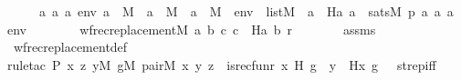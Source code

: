 \begin{isabellebody}
\ \ \ \ {\isachardoublequoteopen}\ {\isacharparenleft}{\kern0pt}{\isasymAnd}a{}\ a{}\ a{}\ env{\isachardot}{\kern0pt}\ a{}\ {\isasymin}\ M\ {\isasymLongrightarrow}\ a{}\ {\isasymin}\ M\ {\isasymLongrightarrow}\ a{}\ {\isasymin}\ M\ {\isasymLongrightarrow}\ env\ {\isasymin}\ list{\isacharparenleft}{\kern0pt}M{\isacharparenright}{\kern0pt}\ {\isasymLongrightarrow}\ a{}\ {\isacharequal}{\kern0pt}\ H{\isacharparenleft}{\kern0pt}a{}{\isacharcomma}{\kern0pt}\ a{}{\isacharparenright}{\kern0pt}\ {\isasymlongleftrightarrow}\ sats{\isacharparenleft}{\kern0pt}M{\isacharcomma}{\kern0pt}\ p{\isacharcomma}{\kern0pt}\ {\isacharbrackleft}{\kern0pt}a{}{\isacharcomma}{\kern0pt}\ a{}{\isacharcomma}{\kern0pt}\ a{}{\isacharbrackright}{\kern0pt}\ {\isacharat}{\kern0pt}\ env{\isacharparenright}{\kern0pt}{\isacharparenright}{\kern0pt}{\isachardoublequoteclose}\ \ \isanewline
\ \ \isanewline
\ \ \ {\isachardoublequoteopen}wfrec{\isacharunderscore}{\kern0pt}replacement{\isacharparenleft}{\kern0pt}{\isacharhash}{\kern0pt}{\isacharhash}{\kern0pt}M{\isacharcomma}{\kern0pt}\ {\isasymlambda}a\ b\ c{\isachardot}{\kern0pt}\ c\ {\isacharequal}{\kern0pt}\ H{\isacharparenleft}{\kern0pt}a{\isacharcomma}{\kern0pt}\ b{\isacharparenright}{\kern0pt}{\isacharcomma}{\kern0pt}\ r{\isacharparenright}{\kern0pt}{\isachardoublequoteclose}\ \isanewline
%
\isadelimproof
\ \ \isanewline
\ \ %
\endisadelimproof
%
\isatagproof
{}\isamarkupfalse%
\ assms\isanewline
\ \ \isamarkupfalse%
\ wfrec{\isacharunderscore}{\kern0pt}replacement{\isacharunderscore}{\kern0pt}def\isanewline
\ \ \isamarkupfalse%
{\isacharparenleft}{\kern0pt}rule{\isacharunderscore}{\kern0pt}tac\ P{\isacharequal}{\kern0pt}{\isachardoublequoteopen}\ {\isasymlambda}x\ z{\isachardot}{\kern0pt}\ {\isasymexists}y{\isacharbrackleft}{\kern0pt}{\isacharhash}{\kern0pt}{\isacharhash}{\kern0pt}M{\isacharbrackright}{\kern0pt}{\isachardot}{\kern0pt}\ {\isasymexists}g{\isacharbrackleft}{\kern0pt}{\isacharhash}{\kern0pt}{\isacharhash}{\kern0pt}M{\isacharbrackright}{\kern0pt}{\isachardot}{\kern0pt}\ pair{\isacharparenleft}{\kern0pt}{\isacharhash}{\kern0pt}{\isacharhash}{\kern0pt}M{\isacharcomma}{\kern0pt}\ x{\isacharcomma}{\kern0pt}\ y{\isacharcomma}{\kern0pt}\ z{\isacharparenright}{\kern0pt}\ {\isasymand}\ is{\isacharunderscore}{\kern0pt}recfun{\isacharparenleft}{\kern0pt}r{\isacharcomma}{\kern0pt}\ x{\isacharcomma}{\kern0pt}\ H{\isacharcomma}{\kern0pt}\ g{\isacharparenright}{\kern0pt}\ {\isasymand}\ y\ {\isacharequal}{\kern0pt}\ H{\isacharparenleft}{\kern0pt}x{\isacharcomma}{\kern0pt}\ g{\isacharparenright}{\kern0pt}{\isachardoublequoteclose}\ \ \ strep{\isacharunderscore}{\kern0pt}iff{\isacharparenright}{\kern0pt}\ \isanewline

\end{isabellebody}
